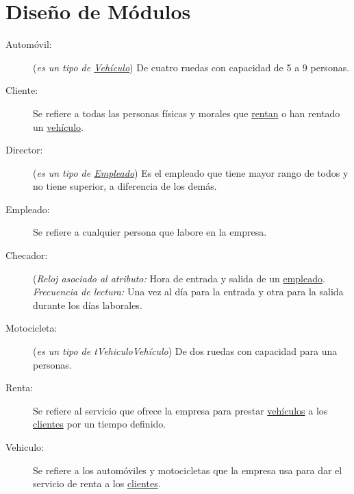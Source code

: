 \section{Diseño de Módulos}
\label{sec:terminosDeNegocio}
\begin{description}
	\item[\hypertarget{tAutomovil}{Automóvil:}] ({\em es un tipo de \hyperlink{tVehiculo}{Vehículo}}) De cuatro ruedas con capacidad de 5 a 9 personas. 
	\item[\hypertarget{tCliente}{Cliente:}] Se refiere a todas las personas físicas y morales que \hyperlink{tRenta}{rentan} o han rentado un \hyperlink{tVehiculo}{vehículo}.
	
	\item[\hypertarget{tDirector}{Director:}] ({\em es un tipo de \hyperlink{tEmpleado}{Empleado}}) Es el empleado que tiene mayor rango de todos y no tiene superior, a diferencia de los demás.	
	\item[\hypertarget{tEmpleado}{Empleado:}] Se refiere a cualquier persona que labore en la empresa.
	
	\item[\hypertarget{tChecador}{Checador:}] ({\em Reloj asociado al atributo:} Hora de entrada y salida de un \hyperlink{tEmpleado}{empleado}. {\em Frecuencia de lectura:} Una vez al día para la entrada y otra para la salida durante los días laborales.
	
	\item[\hypertarget{tMotocicleta}{Motocicleta:}] ({\em es un tipo de {tVehiculo}{Vehículo}}) De dos ruedas con capacidad para una personas. 

	\item[\hypertarget{tRenta}{Renta:}] Se refiere al servicio que ofrece la empresa para prestar \hyperlink{tVehiculo}{vehículos} a los \hyperlink{tCliente}{clientes} por un tiempo definido.
	
	\item[\hypertarget{tVehiculo}{Vehiculo:}] Se refiere a los automóviles y motocicletas que la empresa usa para dar el servicio de renta a los \hyperlink{tCliente}{clientes}.
	
\end{description}

